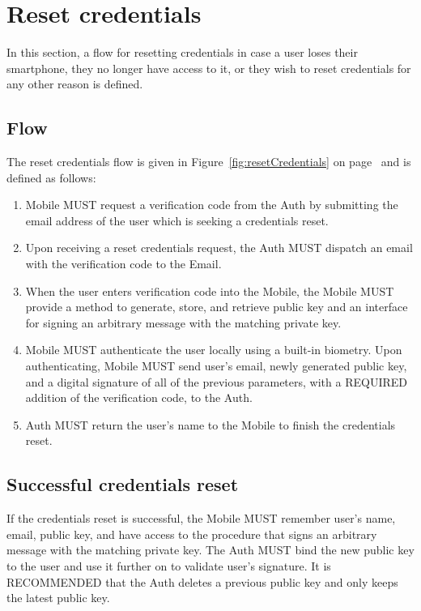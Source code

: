 \section{Reset credentials}
In this section, a flow for resetting credentials in case a user loses their smartphone, they no longer have access to it,
or they wish to reset credentials for any other reason is defined.

    \subsection{Flow}
    The reset credentials flow is given in Figure~\ref{fig:resetCredentials} on page~\pageref{fig:resetCredentials} 
    and is defined as follows:
        \begin{enumerate}
            \item Mobile MUST request a verification code from the Auth by submitting the email address of the user
                  which is seeking a credentials reset.
            \item Upon receiving a reset credentials request, the Auth MUST dispatch an email with the verification
                  code to the Email.
            \item When the user enters verification code into the Mobile, the Mobile MUST provide a method to generate,
                  store, and retrieve public key and an interface for signing an arbitrary message with the matching 
                  private key.
            \item Mobile MUST authenticate the user locally using a built-in biometry. Upon authenticating, Mobile 
                  MUST send user's email, newly generated public key, and a digital signature of all of the previous 
                  parameters, with a REQUIRED addition of the verification code, to the Auth.
            \item Auth MUST return the user's name to the Mobile to finish the credentials reset.
        \end{enumerate}
        

    \subsection{Successful credentials reset}
    If the credentials reset is successful, the Mobile MUST remember user's name, email, public key, and 
    have access to the procedure that signs an arbitrary message with the matching private key. The Auth MUST 
    bind the new public key to the user and use it further on to validate user's signature. It is RECOMMENDED that
    the Auth deletes a previous public key and only keeps the latest public key.

